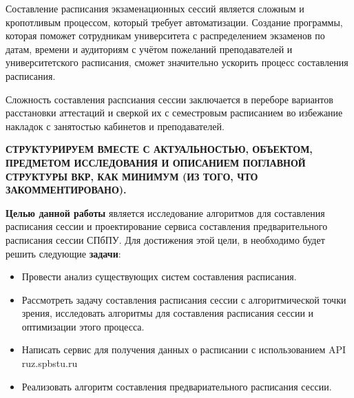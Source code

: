 Составление расписания экзаменационных сессий является сложным и кропотливым процессом, который требует автоматизации. Создание программы, которая поможет сотрудникам университета с распределением экзаменов по датам, времени и аудиториям с учётом пожеланий преподавателей и университетского расписания, сможет значительно ускорить процесс составления расписания. %

Сложность составления распсиания сессии заключается в переборе вариантов расстановки аттестаций и сверкой их с семестровым расписанием во избежание накладок с занятостью кабинетов и преподавателей. 

\textbf{СТРУКТУРИРУЕМ ВМЕСТЕ С АКТУАЛЬНОСТЬЮ, ОБЪЕКТОМ, ПРЕДМЕТОМ ИССЛЕДОВАНИЯ И ОПИСАНИЕМ ПОГЛАВНОЙ СТРУКТУРЫ ВКР, КАК МИНИМУМ (ИЗ ТОГО, ЧТО ЗАКОММЕНТИРОВАНО).}

\textbf{Целью данной работы} является исследование алгоритмов для составления расписания сессии и проектирование сервиса составления предварительного расписания сессии СПбПУ.
Для достижения этой цели, в необходимо будет решить следующие \textbf{задачи}:

\begin{itemize}
	\item Провести анализ существующих систем составления расписания.
	\item Рассмотреть задачу составления расписания сессии с алгоритмической точки зрения, исследовать алгоритмы для составления расписания сессии и оптимизации этого процесса.
	\item Написать сервис для получения данных о расписании с использованием API ruz.spbstu.ru
	\item Реализовать алгоритм составления предвариательного расписания сессии. %
\end{itemize}

